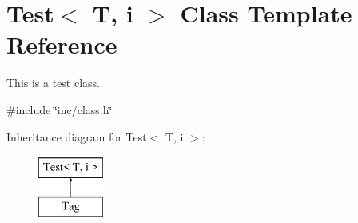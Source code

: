 \hypertarget{class_test}{\section{Test$<$ T, i $>$ Class Template Reference}
\label{class_test}
}


This is a test class.  




{\ttfamily \#include \char`\"{}inc/class.\-h\char`\"{}}

Inheritance diagram for Test$<$ T, i $>$\-:\begin{figure}[H]
\begin{center}
\leavevmode
\includegraphics[height=2.000000cm]{class_test}
\end{center}
\end{figure}
